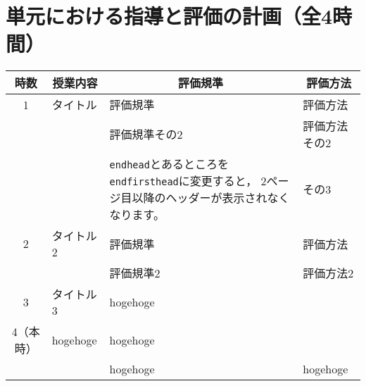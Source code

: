 \documentclass[a4paper,11pt,dvipdfmx,uplatex,%
ja=standard]{bxjsarticle}
\begin{document}
\section{単元における指導と評価の計画（全4時間）}
\begin{longtable}{|c|p{}|p{}|p{}|}
  \hline
  \multicolumn{1}{|c|}{時数} &
  \multicolumn{1}{c|}{授業内容} &
  \multicolumn{1}{c|}{評価規準} &
  \multicolumn{1}{c|}{評価方法}
  \\
  \hline
  \endhead
  1
  &
  タイトル
  &
  評価規準
  &
  評価方法
  \\
  &
  
  &
  評価規準その2
  &
  評価方法その2
  \\
  &

  &
  \verb|endhead|とあるところを
  \verb|endfirsthead|に変更すると，
  2ページ目以降のヘッダーが表示されなくなります。
  &
  その3
  \\
  \hline
  2
  &
  タイトル2
  &
  評価規準  
  &
  評価方法
  \\
  &

  &
  評価規準2
  &
  評価方法2
  \\
  \hline
  3
  &
  タイトル3
  &
  hogehoge
  &
  
  \\
  \hline
  4（本時）
  &
  hogehoge
  &
  hogehoge
  &
  \\
  &

  &
  hogehoge
  &
  hogehoge
  \\
  \hline
\end{longtable}
\end{document}
